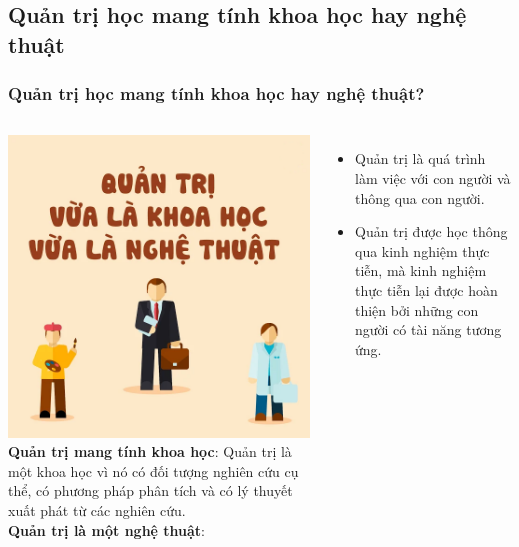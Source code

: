 \documentclass[10pt]{beamer}
\begin{document}
\subsection{Quản trị học mang tính khoa học hay nghệ thuật}


\begin{frame}
\transblindshorizontal
\frametitle{Quản trị học mang tính khoa học hay nghệ thuật?}
\begin{columns}

\includegraphics[scale=0.3]{Figs/fig4.png}
\pause
{}
\textbf{Quản trị mang tính khoa học}: Quản trị là một khoa học vì nó có đối tượng nghiên cứu cụ thể, có phương pháp phân tích và có lý thuyết xuất phát từ các nghiên cứu.\\
\pause
\vspace{10pt}
\textbf{Quản trị là một nghệ thuật}:
\begin{itemize}
\item Quản trị là quá trình làm việc với con người và thông qua con người.
\item Quản trị được học thông qua kinh nghiệm thực tiễn, mà kinh nghiệm thực tiễn lại được hoàn thiện bởi những con người có tài năng tương ứng.
\end{itemize}

\end{columns}


\end{frame}
\end{document}
